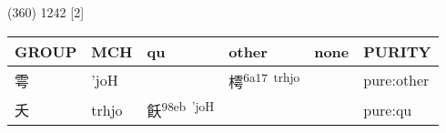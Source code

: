 \documentclass[14pt,a4paper]{scrartcl}
\begin{document}
(360) 1242 {[}2{]}

\begin{longtable}[c]{@{}llllll@{}}
\toprule
\begin{minipage}[b]{0.14\columnwidth}\raggedright\strut
GROUP
\strut\end{minipage} &
\begin{minipage}[b]{0.14\columnwidth}\raggedright\strut
MCH
\strut\end{minipage} &
\begin{minipage}[b]{0.14\columnwidth}\raggedright\strut
qu
\strut\end{minipage} &
\begin{minipage}[b]{0.14\columnwidth}\raggedright\strut
other
\strut\end{minipage} &
\begin{minipage}[b]{0.14\columnwidth}\raggedright\strut
none
\strut\end{minipage} &
\begin{minipage}[b]{0.14\columnwidth}\raggedright\strut
PURITY
\strut\end{minipage}\tabularnewline
\midrule
\endhead
\begin{minipage}[t]{0.14\columnwidth}\raggedright\strut
雩
\strut\end{minipage} &
\begin{minipage}[t]{0.14\columnwidth}\raggedright\strut
'joH
\strut\end{minipage} &
\begin{minipage}[t]{0.14\columnwidth}\raggedright\strut
\strut\end{minipage} &
\begin{minipage}[t]{0.14\columnwidth}\raggedright\strut
樗\textsuperscript{6a17~trhjo}
\strut\end{minipage} &
\begin{minipage}[t]{0.14\columnwidth}\raggedright\strut
\strut\end{minipage} &
\begin{minipage}[t]{0.14\columnwidth}\raggedright\strut
pure:other
\strut\end{minipage}\tabularnewline
\begin{minipage}[t]{0.14\columnwidth}\raggedright\strut
夭
\strut\end{minipage} &
\begin{minipage}[t]{0.14\columnwidth}\raggedright\strut
trhjo
\strut\end{minipage} &
\begin{minipage}[t]{0.14\columnwidth}\raggedright\strut
飫\textsuperscript{98eb~'joH}
\strut\end{minipage} &
\begin{minipage}[t]{0.14\columnwidth}\raggedright\strut
\strut\end{minipage} &
\begin{minipage}[t]{0.14\columnwidth}\raggedright\strut
\strut\end{minipage} &
\begin{minipage}[t]{0.14\columnwidth}\raggedright\strut
pure:qu
\strut\end{minipage}\tabularnewline
\bottomrule
\end{longtable}
\end{document}
